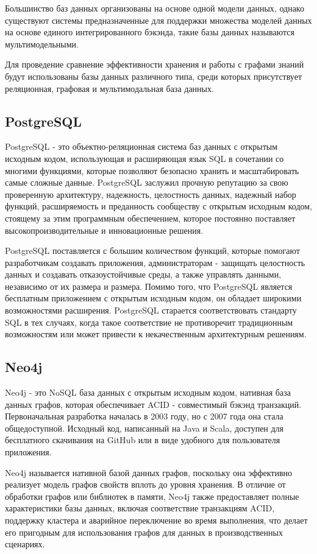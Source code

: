 Большинство баз данных организованы на основе одной модели данных, однако существуют системы предназначенные для поддержки множества
моделей данных на основе единого интегрированного бэкэнда, такие базы данных называются мультимодельными.

Для проведение сравнение эффективности хранения и работы с графами знаний будут использованы базы данных различного типа, среди которых
присутствует реляционная, графовая и мультимодальная база данных.

\subsection{PostgreSQL}

PostgreSQL - это объектно-реляционная система баз данных с открытым исходным кодом, использующая и расширяющая язык SQL в сочетании со
многими функциями, которые позволяют безопасно хранить и масштабировать самые сложные данные. PostgreSQL заслужил прочную репутацию за
свою проверенную архитектуру, надежность, целостность данных, надежный набор функций, расширяемость и преданность сообществу с открытым
исходным кодом, стоящему за этим программным обеспечением, которое постоянно поставляет высокопроизводительные и инновационные решения.

PostgreSQL поставляется с большим количеством функций, которые помогают разработчикам создавать приложения, администраторам - защищать
целостность данных и создавать отказоустойчивые среды, а также управлять данными, независимо от их размера и размера. Помимо того, что
PostgreSQL является бесплатным приложением с открытым исходным кодом, он обладает широкими возможностями расширения. PostgreSQL старается
соответствовать стандарту SQL в тех случаях, когда такое соответствие не противоречит традиционным возможностям или может привести к
некачественным архитектурным решениям.

\subsection{Neo4j}

Neo4j - это NoSQL база данных с открытым исходным кодом, нативная база данных графов, которая обеспечивает ACID - совместимый бэкэнд
транзакций. Первоначальная разработка началась в 2003 году, но с 2007 года она стала общедоступной. Исходный код, написанный на Java и Scala,
доступен для бесплатного скачивания на GitHub или в виде удобного для пользователя приложения.

Neo4j называется нативной базой данных графов, поскольку она эффективно реализует модель графов свойств вплоть до уровня хранения.
В отличие от обработки графов или библиотек в памяти, Neo4j также предоставляет полные характеристики базы данных, включая соответствие
транзакциям ACID, поддержку кластера и аварийное переключение во время выполнения, что делает его пригодным для использования графов для
данных в производственных сценариях.

